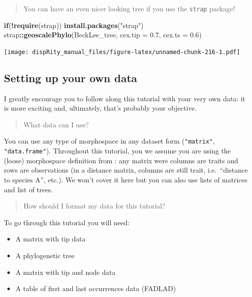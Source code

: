 \documentclass[
]{book}
\newenvironment{Shaded}{\begin{snugshade}}{\end{snugshade}}
\newcommand{\ControlFlowTok}[1]{\textcolor[rgb]{0.13,0.29,0.53}{\textbf{#1}}}
\newcommand{\DataTypeTok}[1]{\textcolor[rgb]{0.13,0.29,0.53}{#1}}
\newcommand{\FloatTok}[1]{\textcolor[rgb]{0.00,0.00,0.81}{#1}}
\newcommand{\KeywordTok}[1]{\textcolor[rgb]{0.13,0.29,0.53}{\textbf{#1}}}
\newcommand{\NormalTok}[1]{#1}
\newcommand{\OperatorTok}[1]{\textcolor[rgb]{0.81,0.36,0.00}{\textbf{#1}}}
\newcommand{\StringTok}[1]{\textcolor[rgb]{0.31,0.60,0.02}{#1}}
\providecommand{\tightlist}{%
  \setlength{\itemsep}{0pt}\setlength{\parskip}{0pt}}
\begin{document}
\begin{quote}
You can have an even nicer looking tree if you use the \texttt{strap} package!
\end{quote}

\begin{Shaded}
\begin{Highlighting}[]
\ControlFlowTok{if}\NormalTok{(}\OperatorTok{!}\KeywordTok{require}\NormalTok{(strap)) }\KeywordTok{install.packages}\NormalTok{(}\StringTok{"strap"}\NormalTok{)}
\NormalTok{strap}\OperatorTok{::}\KeywordTok{geoscalePhylo}\NormalTok{(BeckLee\_tree, }\DataTypeTok{cex.tip =} \FloatTok{0.7}\NormalTok{, }\DataTypeTok{cex.ts =} \FloatTok{0.6}\NormalTok{)}
\end{Highlighting}
\end{Shaded}

\texttt{[image: dispRity\_manual\_files/figure-latex/unnamed-chunk-216-1.pdf]}

\hypertarget{setting-up-your-own-data}{%
\subsection{Setting up your own data}\label{setting-up-your-own-data}}

I greatly encourage you to follow along this tutorial with your very own data: it is more exciting and, ultimately, that's probably your objective.

\begin{quote}
What data can I use?
\end{quote}

You can use any type of morphospace in any dataset form (\texttt{"matrix"}, \texttt{"data.frame"}). Throughout this tutorial, you we assume you are using the (loose) morphospace definition from \citet{Guillerme2020}: any matrix were columns are traits and rows are observations (in a distance matrix, columns are still trait, i.e.~``distance to species A'', etc.).
We won't cover it here but you can also use lists of matrices and list of trees.

\begin{quote}
How should I format my data for this tutorial?
\end{quote}

To go through this tutorial you will need:

\begin{itemize}
\tightlist
\item
  A matrix with tip data
\item
  A phylogenetic tree
\item
  A matrix with tip and node data
\item
  A table of first and last occurrences data (FADLAD)
\end{itemize}
\end{document}
